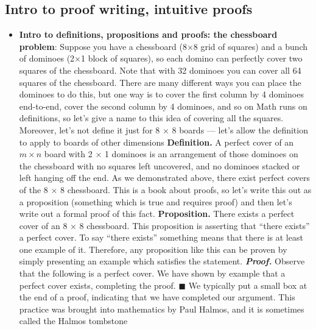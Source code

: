 \documentclass{report}
\begin{document}
    \subsection{Intro to proof writing, intuitive proofs}
    \begin{itemize}
        \item \textbf{Intro to definitions, propositions and proofs: the chessboard problem}: Suppose you have a chessboard (8$\times$8 grid of squares) and a bunch of dominoes (2$\times$1 block of squares), so each domino can perfectly cover two squares of the chessboard.
            \bigbreak \noindent 
            Note that with 32 dominoes you can cover all 64 squares of the chessboard. There are many different ways you can place the dominoes to do this, but one way is to cover the first column by 4 dominoes end-to-end, cover the second column by 4 dominoes, and so on
            \bigbreak \noindent 
            Math runs on definitions, so let’s give a name to this idea of covering all the squares. Moreover, let’s not define it just for 8 $\times$ 8 boards — let’s allow the definition to apply to boards of other dimensions
            \bigbreak \noindent 
            \textbf{Definition.} A perfect cover of an $m\times n$ board with 2 $\times$ 1 dominoes is an arrangement of those dominoes on the chessboard with no squares left uncovered, and no dominoes stacked or left hanging off the end.
            \bigbreak \noindent 
            As we demonstrated above, there exist perfect covers of the 8 $\times$ 8 chessboard. This is a book about proofs, so let’s write this out as a proposition (something which is true and requires proof) and then let’s write out a formal proof of this fact.
            \bigbreak \noindent 
            \textbf{Proposition.} There exists a perfect cover of an 8 $\times$ 8 chessboard.
            \bigbreak \noindent 
            This proposition is asserting that “there exists” a perfect cover. To say “there exists” something means that there is at least one example of it. Therefore, any proposition like this can be proven by simply presenting an example which satisfies the statement.
            \bigbreak \noindent 
            \textbf{\textit{Proof.}} Observe that the following is a perfect cover.
            \bigbreak \noindent 
            \bigbreak \noindent 
            We have shown by example that a perfect cover exists, completing the proof. $\blacksquare$
            \bigbreak \noindent 
            We typically put a small box at the end of a proof, indicating that we have completed our argument. This practice was brought into mathematics by Paul Halmos, and it is sometimes called the Halmos tombstone

\end{itemize}
\end{document}
